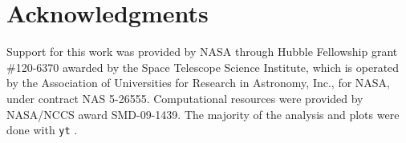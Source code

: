 \documentclass[useAMS,usenatbib]{mn2e}
\begin{document}
\section*{Acknowledgments}

Support for this work was provided by NASA through Hubble Fellowship
grant \#120-6370 awarded by the Space Telescope Science Institute,
which is operated by the Association of Universities for Research in
Astronomy, Inc., for NASA, under contract NAS 5-26555.  Computational
resources were provided by NASA/NCCS award SMD-09-1439.  The majority
of the analysis and plots were done with \texttt{yt}
\citep{yt_full_paper}.



\bsp

\label{lastpage}
\end{document}
